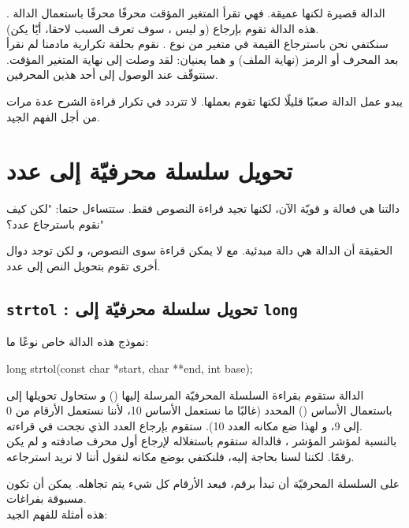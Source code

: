 الدالة
قصيرة لكنها عميقة. فهي تقرأ المتغير المؤقت محرفًا محرفًا باستعمال الدالة
.
هذه الدالة تقوم بإرجاع
(و ليس
،
سوف تعرف السبب لاحقا، أيّا يكن).\\
سنكتفي نحن باسترجاع القيمة في متغير
من نوع
.
نقوم بحلقة تكرارية مادمنا لم نقرأ بعد المحرف
 أو الرمز
(نهاية الملف) و هما يعنيان: لقد وصلت إلى نهاية المتغير المؤقت. سنتوقّف عند الوصول إلى أحد هذين المحرفين.

يبدو عمل الدالة
صعبًا قليلًا لكنها تقوم بعملها. لا تتردد في تكرار قراءة الشرح عدة مرات من أجل الفهم الجيد.

\section{تحويل سلسلة محرفيّة إلى عدد}

دالتنا
هي فعالة و قويّة الآن، لكنها تجيد قراءة النصوص فقط. ستتساءل حتما: "لكن كيف نقوم باسترجاع عدد؟"

الحقيقة أن الدالة
هي دالة مبدئية. مع
لا يمكن قراءة سوى النصوص، و لكن توجد دوال أخرى تقوم بتحويل النص إلى عدد.

\subsection{\texttt{strtol} : تحويل سلسلة محرفيّة إلى \texttt{long}}

نموذج هذه الدالة خاص نوعًا ما:

\begin{Csource}
long strtol(const char *start, char **end, int base);
\end{Csource}

الدالة ستقوم بقراءة السلسلة المحرفيّة المرسلة إليها
()
و ستحاول تحويلها إلى
باستعمال الأساس
()
المحدد (غالبًا ما نستعمل الأساس 10، لأننا نستعمل الأرقام من 0 إلى 9، و لهذا ضع مكانه العدد 10). ستقوم بإرجاع العدد الذي نجحت في قراءته.\\
بالنسبة لمؤشر المؤشر
،
فالدالة ستقوم باستغلاله لإرجاع أول محرف صادفته و لم يكن رقمًا. لكننا لسنا بحاجة إليه، فلنكتفي بوضع
مكانه لنقول أننا لا نريد استرجاعه.

على السلسلة المحرفيّة أن تبدأ برقم، فبعد الأرقام كل شيء يتم تجاهله. يمكن أن تكون مسبوقة بفراغات.\\
هذه أمثلة للفهم الجيد:

